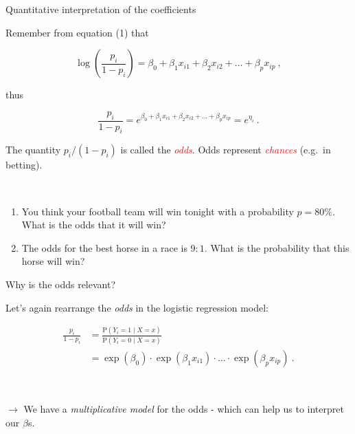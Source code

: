 \documentclass[10pt,ignorenonframetext,]{beamer}
\begin{document}
\begin{frame}

\begin{block}{Quantitative interpretation of the coefficients}

\vspace{2mm} Remember from equation (1) that

\begin{equation*}
\log\left( \frac{p_i}{1-p_i} \right) = \beta_0 + \beta_1 x_{i1} + \beta_2 x_{i2} + \ldots + \beta_p x_{ip} \ ,
\end{equation*}

thus

\begin{equation*}
 \frac{p_i}{1-p_i} = e^{\beta_0 + \beta_1 x_{i1} + \beta_2 x_{i2} + \ldots + \beta_p x_{ip}} = e^{\eta_i} \ .
\end{equation*}

\vspace{2mm}

The quantity \(p_i/(1-p_i)\) is called the \emph{\textcolor{red}{odds}}.
Odds represent \emph{\textcolor{red}{chances}} (e.g.~in betting).

\(~\)

\begin{enumerate}
\def\labelenumi{\arabic{enumi}.}
\item
  You think your football team will win tonight with a probability
  \(p=80\%\). What is the odds that it will win?
\item
  The odds for the best horse in a race is \(9:1\). What is the
  probability that this horse will win?
\end{enumerate}

\end{block}

\end{frame}

\begin{frame}

\begin{block}{Why is the odds relevant?}

\vspace{2mm} Let's again rearrange the \emph{odds} in the logistic
regression model:

\begin{align*}
 \frac{p_i}{1-p_i} &=  \frac{\text{P}(Y_i=1 \mid X=x)}{\text{P}(Y_i=0 \mid X = x)} \\[2mm]
 &= \exp(\beta_0) \cdot \exp(\beta_1 x_{i1}) \cdot \ldots \cdot  \exp(\beta_p x_{ip}) \ .
 \end{align*}

\(~\)

\(\rightarrow\) We have a \emph{multiplicative model} for the odds -
which can help us to interpret our \(\beta\)s.

\end{block}

\end{frame}
\end{document}
